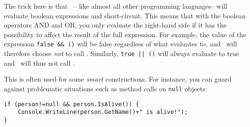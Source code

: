 The trick here is that \csharp\ -- like almost all other programming languages ​​-- will evaluate boolean expressions  and short-circuit. This means that with the boolean operators AND and OR, you only evaluate the right-hand side if it has the possibility to affect the result of the full expression. For example, the value of the expression \texttt{false \&\& ()} will be false regardless of what  evaluates to, and \csharp\ will therefore choose \textsl{not} to call . Similarly, \texttt{true || ()} will always evaluate to true and \csharp\ will thus not call .

This is often used for some \textsl{smart} constructions. For instance, you can guard against problematic situations such as method calls on \texttt{null} objects:

\begin{verbatim}
if (person!=null && person.IsAlive()) {
    Console.WriteLine(person.GetName()+" is alive!");
}
\end{verbatim}
